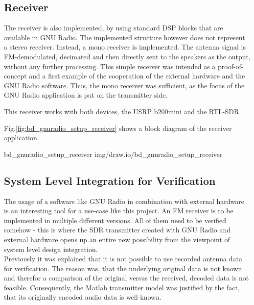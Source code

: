 \subsection{Receiver}

The receiver is also implemented, by using standard DSP blocks that are available in GNU Radio.
The implemented structure however does not represent a stereo receiver.
Instead, a mono receiver is implemented.
The antenna signal is FM-demodulated, decimated and then directly sent to the speakers as the output, without any further processing.
This simple receiver was intended as a proof-of-concept and a first example of the cooperation of the external hardware and the GNU Radio software.
Thus, the mono receiver was sufficient, as the focus of the GNU Radio application is put on the transmitter side.

This receiver works with both devices, the USRP b200mini and the RTL-SDR.

Fig.\ref{fig:bd_gnuradio_setup_receiver} shows a block diagram of the receiver application.

 {bd_gnuradio_setup_receiver} {img/draw.io/bd_gnuradio_setup_receiver}

\subsection{System Level Integration for Verification}

The usage of a software like GNU Radio in combination with external hardware is an interesting tool for a use-case like this project.
An FM receiver is to be implemented in multiple different versions.
All of them need to be verified somehow - this is where the SDR transmitter created with GNU Radio and external hardware opens up an entire new possibility from the viewpoint of system level design integration.\\

Previously it was explained that it is not possible to use recorded antenna data for verification.
The reason was, that the underlying original data is not known and therefor a comparison of the original versus the received, decoded data is not feasible.
Consequently, the Matlab transmitter model was justified by the fact, that its originally encoded audio data is well-known.\\

